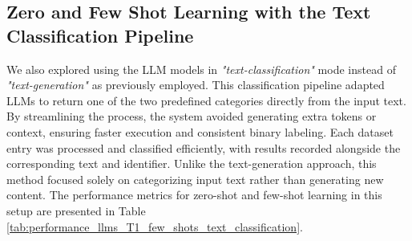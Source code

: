 \documentclass{Configuration_Files/PoliMi3i_thesis}
\begin{document}
\subsection{Zero and Few Shot Learning with the Text Classification Pipeline}
We also explored using the LLM models in \textit{"text-classification"} mode instead of \textit{"text-generation"} as previously employed. This classification pipeline adapted LLMs to return one of the two predefined categories directly from the input text. By streamlining the process, the system avoided generating extra tokens or context, ensuring faster execution and consistent binary labeling. Each dataset entry was processed and classified efficiently, with results recorded alongside the corresponding text and identifier. Unlike the text-generation approach, this method focused solely on categorizing input text rather than generating new content. The performance metrics for zero-shot and few-shot learning in this setup are presented in Table \ref{tab:performance_llms_T1_few_shots_text_classification}.
\end{document}
